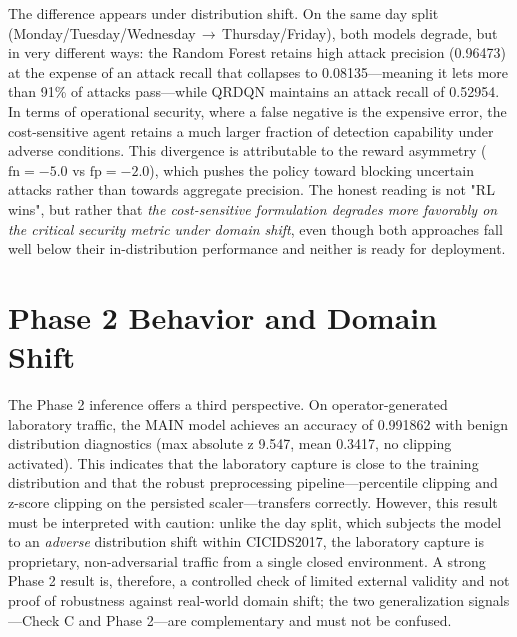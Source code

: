 The difference appears under distribution shift. On the same day split (Monday/Tuesday/Wednesday\,$\rightarrow$\,Thursday/Friday), both models degrade, but in very different ways: the Random Forest retains high attack precision (0.96473) at the expense of an attack recall that collapses to 0.08135---meaning it lets more than 91\% of attacks pass---while QRDQN maintains an attack recall of 0.52954. In terms of operational security, where a false negative is the expensive error, the cost-sensitive agent retains a much larger fraction of detection capability under adverse conditions. This divergence is attributable to the reward asymmetry ($\mathrm{fn}=-5.0$ vs $\mathrm{fp}=-2.0$), which pushes the policy toward blocking uncertain attacks rather than towards aggregate precision. The honest reading is not "RL wins", but rather that \emph{the cost-sensitive formulation degrades more favorably on the critical security metric under domain shift}, even though both approaches fall well below their in-distribution performance and neither is ready for deployment.

\section{Phase 2 Behavior and Domain Shift}
The Phase 2 inference offers a third perspective. On operator-generated laboratory traffic, the MAIN model achieves an accuracy of 0.991862 with benign distribution diagnostics (max absolute z 9.547, mean 0.3417, no clipping activated). This indicates that the laboratory capture is close to the training distribution and that the robust preprocessing pipeline---percentile clipping and z-score clipping on the persisted scaler---transfers correctly. However, this result must be interpreted with caution: unlike the day split, which subjects the model to an \emph{adverse} distribution shift within CICIDS2017, the laboratory capture is proprietary, non-adversarial traffic from a single closed environment. A strong Phase 2 result is, therefore, a controlled check of limited external validity and not proof of robustness against real-world domain shift; the two generalization signals---Check C and Phase 2---are complementary and must not be confused.
